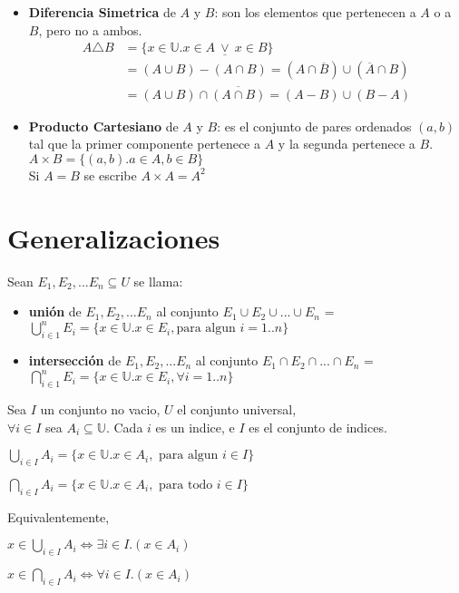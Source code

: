\documentclass[11pt,a4paper]{article}
\begin{document}
\begin{itemize}
\item \textbf{Diferencia Simetrica} de $A$ y $B$: son los elementos que pertenecen a $A$ o a $B$, pero no a ambos.
\begin{align*}
A \triangle B 
&= \{x\in \mathbb{U} . x\in A\ \underline{\lor}\ x\in B\}\\
&= (A \cup B) - (A \cap B) = (A \cap \overline{B}) \cup (\overline{A} \cap B)\\
&= (A \cup B) \cap \overline{(A \cap B)} = (A-B) \cup (B-A)
\end{align*}

\item \textbf{Producto Cartesiano} de $A$ y $B$: es el conjunto de pares ordenados $(a,b)$ tal que la primer componente pertenece a $A$ y la segunda pertenece a $B$.\\
$A\times B = \{ (a,b) . a\in A, b\in B \}$\\
Si $A = B$ se escribe $A \times A = A^2$\\
\end{itemize}
\newpage

\section{Generalizaciones}
\noindent Sean $E_1, E_2,...E_n \subseteq U$ se llama:
\begin{itemize}
\item \textbf{uni\'on} de $E_1, E_2,...E_n$ al conjunto $E_1 \cup E_2 \cup ... \cup E_n$ = $\displaystyle{\bigcup_{i \in 1}^{n} E_i} = \{ x \in \mathbb{U} . x\in E_i, \text{para algun } i=1..n \}$
\item \textbf{intersecci\'on} de $E_1, E_2,...E_n$ al conjunto $E_1 \cap E_2 \cap ... \cap E_n$ = $\displaystyle{\bigcap_{i \in 1}^{n} E_i} = \{ x \in \mathbb{U} . x\in E_i, \forall i=1..n \}$
\end{itemize}

\noindent Sea $I$ un conjunto no vacio, $U$ el conjunto universal,\\
$\forall i \in I$ sea $A_i \subseteq \mathbb{U}$. Cada $i$ es un indice, e $I$ es el conjunto de indices.\\
\begin{itemize}
\begin{multicols}{2}
\item $\displaystyle{\bigcup_{i \in I} A_i} = \{ x \in \mathbb{U} . x\in A_i, \text{ para algun } i\in I \}$
\item $\displaystyle{\bigcap_{i \in I} A_i} = \{ x \in \mathbb{U} . x\in A_i, \text{ para todo } i\in I \}$
\end{multicols}
\end{itemize}
Equivalentemente,
\begin{itemize}
\begin{multicols}{2}
\item $x \in \displaystyle{\bigcup_{i \in I} A_i} \iff \exists i \in I . (x \in A_i)$
\item $x \in \displaystyle{\bigcap_{i \in I} A_i} \iff \forall i \in I . (x \in A_i)$
\end{multicols}
\end{itemize}
\end{document}
